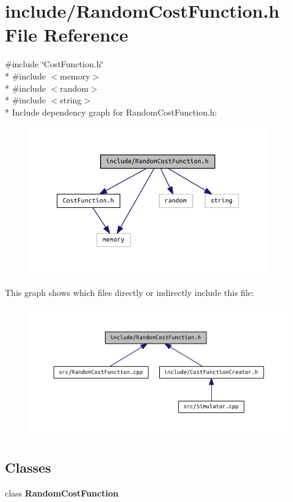 \section{include/\+Random\+Cost\+Function.h File Reference}
\label{_random_cost_function_8h}
{\ttfamily \#include \char`\"{}Cost\+Function.\+h\char`\"{}}\\*
{\ttfamily \#include $<$memory$>$}\\*
{\ttfamily \#include $<$random$>$}\\*
{\ttfamily \#include $<$string$>$}\\*
Include dependency graph for Random\+Cost\+Function.\+h\+:
\nopagebreak
\begin{figure}[H]
\begin{center}
\leavevmode
\includegraphics[width=292pt]{_random_cost_function_8h__incl}
\end{center}
\end{figure}
This graph shows which files directly or indirectly include this file\+:
\nopagebreak
\begin{figure}[H]
\begin{center}
\leavevmode
\includegraphics[width=350pt]{_random_cost_function_8h__dep__incl}
\end{center}
\end{figure}
\subsection*{Classes}
\begin{DoxyCompactItemize}
\item 
class {\bf Random\+Cost\+Function}
\end{DoxyCompactItemize}
